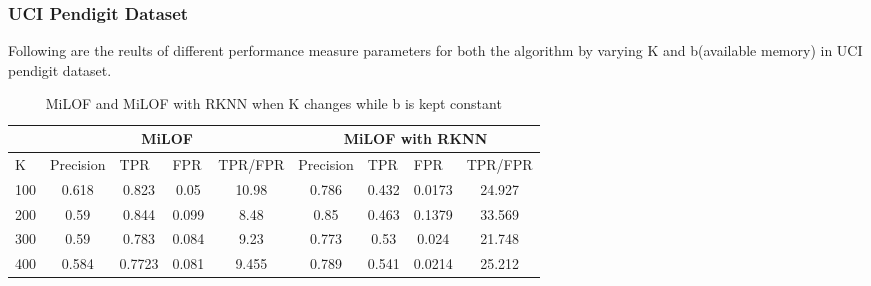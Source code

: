 \subsubsection{UCI Pendigit Dataset}

Following are the reults of different performance measure parameters for both the algorithm by varying K and b(available memory) in UCI pendigit dataset. 

\begin{table}[H]
	\centering
	\caption{MiLOF and MiLOF with RKNN when K changes while b is kept constant}
	\label{my-label}
	\begin{tabular}{|l|c|c|c|c|c|c|c|c|}
		\hline
		& \multicolumn{4}{c|}{MiLOF}                                                                                                    & \multicolumn{4}{c|}{MiLOF with RKNN}                                                                                          \\ \hline
		K                         & \multicolumn{1}{l|}{Precision} & \multicolumn{1}{l|}{TPR} & \multicolumn{1}{l|}{FPR} & \multicolumn{1}{l|}{TPR/FPR} & \multicolumn{1}{l|}{Precision} & \multicolumn{1}{l|}{TPR} & \multicolumn{1}{l|}{FPR} & \multicolumn{1}{l|}{TPR/FPR} \\ \hline
		100                       & 0.618                          & 0.823                              & 0.05                     & 10.98                        & 0.786                          & 0.432                              & 0.0173                   & 24.927                       \\ \hline
		\multicolumn{1}{|c|}{200} & 0.59                           & 0.844                              & 0.099                    & 8.48                         & 0.85                           & 0.463                              & 0.1379                   & 33.569                       \\ \hline
		\multicolumn{1}{|c|}{300} & 0.59                           & 0.783                              & 0.084                    & 9.23                         & 0.773                          & 0.53                               & 0.024                    & 21.748                       \\ \hline
		\multicolumn{1}{|c|}{400} & 0.584                          & 0.7723                             & 0.081                    & 9.455                        & 0.789                          & 0.541                              & 0.0214                   & 25.212                       \\ \hline

\end{tabular}
\end{table}
